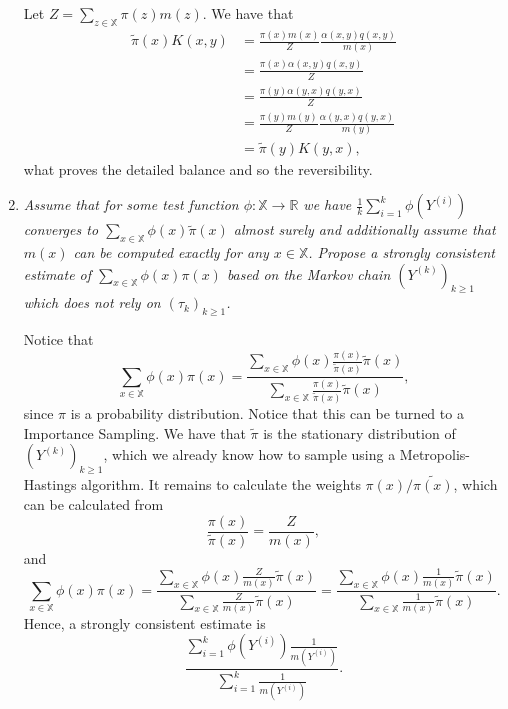 \documentclass[a4paper,12pt]{article}
\newcommand{\R}{\mathbb{R}}
\theoremstyle{definition}
\begin{document}
\begin{enumerate}
    Let $Z = \sum_{z \in \mathbb{X}} \pi(z)m(z)$. We have that 
    \begin{equation*}
        \begin{split}
            \tilde{\pi}(x)K(x,y) &= \frac{\pi(x)m(x)}{Z}\frac{\alpha(x,y)q(x,y)}{m(x)} \\
            &= \frac{\pi(x)\alpha(x,y)q(x,y)}{Z} \\
            &= \frac{\pi(y)\alpha(y,x)q(y,x)}{Z} \\
            &= \frac{\pi(y)m(y)}{Z}\frac{\alpha(y,x)q(y,x)}{m(y)} \\
            &= \tilde{\pi}(y)K(y,x),
        \end{split}
    \end{equation*}
    what proves the detailed balance and so the reversibility. 

    \item {\it Assume that for some test function $\phi : \mathbb{X} \to \R$
    we have $\frac{1}{k}\sum_{i=1}^k \phi(Y^{(i)})$ converges to $\sum_{x\in \mathbb{X}}
    \phi(x) \tilde{\pi}(x)$ almost surely and additionally assume that 
    $m(x)$ can be computed exactly for any $x \in \mathbb{X}$.
    Propose a strongly consistent estimate of $\sum_{x\in \mathbb{X}}
    \phi(x) \pi(x)$ based on the Markov chain $(Y^{(k)})_{k\ge 1}$ which does
    not rely on $(\tau_k)_{k \ge 1}$.}

    Notice that 
    $$
    \sum_{x\in \mathbb{X}}
    \phi(x) \pi(x) = \frac{\sum_{x \in \mathbb{X}} 
    \phi(x)\frac{\pi(x)}{\tilde{\pi}(x)}\tilde{\pi}(x)}{\sum_{x \in \mathbb{X}}
    \frac{\pi(x)}{\tilde{\pi}(x)}\tilde{\pi}(x)},
    $$
    since $\pi$ is a probability distribution. Notice that this can 
    be turned to a Importance Sampling. We have that $\tilde{\pi}$ is the stationary 
    distribution of $(Y^{(k)})_{k\ge 1}$, which we already know how to 
    sample using a Metropolis-Hastings algorithm. It remains to calculate 
    the weights $\pi(x)/\tilde{\pi(x)}$, which can be calculated from 
    $$
    \frac{\pi(x)}{\tilde{\pi}(x)} = \frac{Z}{m(x)},
    $$
    and
    $$
    \sum_{x\in \mathbb{X}}
    \phi(x) \pi(x) = \frac{\sum_{x \in \mathbb{X}} 
    \phi(x)\frac{Z}{m(x)}\tilde{\pi}(x)}{\sum_{x \in \mathbb{X}}
    \frac{Z}{m(x)}\tilde{\pi}(x)}  = \frac{\sum_{x \in \mathbb{X}} 
    \phi(x)\frac{1}{m(x)}\tilde{\pi}(x)}{\sum_{x \in \mathbb{X}}
    \frac{1}{m(x)}\tilde{\pi}(x)}.
    $$ 
    Hence, a strongly consistent estimate is 
    $$
    \frac{\sum_{i=1}^k \phi(Y^{(i)})\frac{1}{m(Y^{(i)})}}{\sum_{i=1}^k \frac{1}{m(Y^{(i)})}}.
    $$

\end{enumerate}
\end{document}
